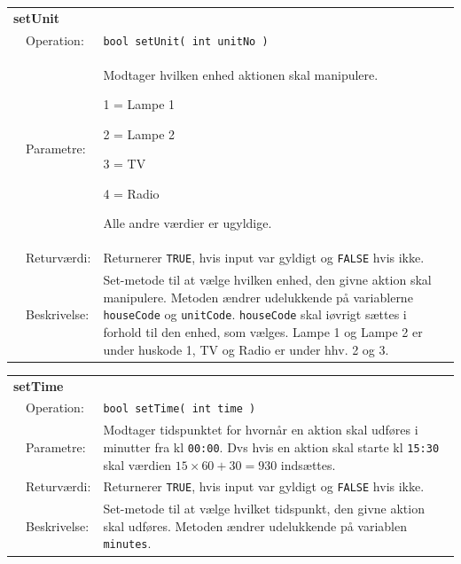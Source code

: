 \begin{table}[h] 
\begin{tabularx}{\textwidth}{p{0.6 cm} l X} %
\multicolumn{3}{l}{\textbf{setUnit}}\\
& Operation: & %
\texttt{bool setUnit( int unitNo )} 
\\ & Parametre: & %
Modtager hvilken enhed aktionen skal manipulere.

1 = Lampe 1

2 = Lampe 2

3 = TV

4 = Radio

Alle andre værdier er ugyldige. 
\\ & Returværdi: & %
Returnerer \texttt{TRUE}, hvis input var gyldigt og \texttt{FALSE} hvis ikke.
\\ & Beskrivelse: & %
Set-metode til at vælge hvilken enhed, den givne aktion skal manipulere. Metoden ændrer udelukkende på variablerne \texttt{houseCode} og \texttt{unitCode}. \texttt{houseCode} skal iøvrigt sættes i forhold til den enhed, som vælges. Lampe 1 og Lampe 2 er under huskode 1, TV og Radio er under hhv. 2 og 3.
\\ \end{tabularx}
\end{table}

\begin{table}[h] 
\begin{tabularx}{\textwidth}{p{0.6 cm} l X} %
\multicolumn{3}{l}{\textbf{setTime}}\\
& Operation: & %
\texttt{bool setTime( int time ) }
\\ & Parametre: & %
Modtager tidspunktet for hvornår en aktion skal udføres i minutter fra kl \texttt{00:00}. Dvs hvis en aktion skal starte kl \texttt{15:30} skal værdien $15 \times 60 + 30 = 930$ indsættes.
\\ & Returværdi: & %
Returnerer \texttt{TRUE}, hvis input var gyldigt og \texttt{FALSE} hvis ikke.
\\ & Beskrivelse: & %
Set-metode til at vælge hvilket tidspunkt, den givne aktion skal udføres. Metoden ændrer udelukkende på variablen \texttt{minutes}.
\\ \end{tabularx}
\end{table}

